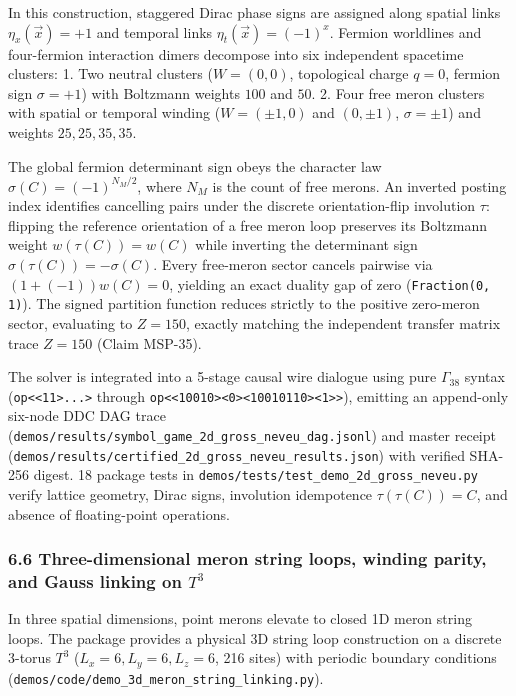 \documentclass[
  11pt,
]{article}
\newcommand{\passthrough}[1]{#1}
\begin{document}
In this construction, staggered Dirac phase signs are assigned along
spatial links \(\eta_x(\vec{x}) = +1\) and temporal links
\(\eta_t(\vec{x}) = (-1)^x\). Fermion worldlines and four-fermion
interaction dimers decompose into six independent spacetime clusters: 1.
Two neutral clusters (\(W = (0, 0)\), topological charge \(q = 0\),
fermion sign \(\sigma = +1\)) with Boltzmann weights \(100\) and \(50\).
2. Four free meron clusters with spatial or temporal winding
(\(W = (\pm 1, 0)\) and \((0, \pm 1)\), \(\sigma = \pm 1\)) and weights
\(25, 25, 35, 35\).

The global fermion determinant sign obeys the character law
\(\sigma(C) =
(-1)^{N_M / 2}\), where \(N_M\) is the count of free merons. An inverted
posting index identifies cancelling pairs under the discrete
orientation-flip involution \(\tau\): flipping the reference orientation
of a free meron loop preserves its Boltzmann weight
\(w(\tau(C)) = w(C)\) while inverting the determinant sign
\(\sigma(\tau(C)) = -\sigma(C)\). Every free-meron sector cancels
pairwise via \((1 + (-1)) w(C) = 0\), yielding an exact duality gap of
zero (\passthrough{\lstinline!Fraction(0, 1)!}). The signed partition
function reduces strictly to the positive zero-meron sector, evaluating
to \(Z = 150\), exactly matching the independent transfer matrix trace
\(Z = 150\) (Claim MSP-35).

The solver is integrated into a 5-stage causal wire dialogue using pure
\(\Gamma_{38}\) syntax (\passthrough{\lstinline!op<<11>...>!} through
\passthrough{\lstinline!op<<10010><0><10010110><1>>!}), emitting an
append-only six-node DDC DAG trace
(\nolinkurl{demos/results/symbol_game_2d_gross_neveu_dag.jsonl}) and
master receipt
(\nolinkurl{demos/results/certified_2d_gross_neveu_results.json}) with
verified SHA-256 digest. 18 package tests in
\nolinkurl{demos/tests/test_demo_2d_gross_neveu.py} verify lattice
geometry, Dirac signs, involution idempotence \(\tau(\tau(C)) = C\), and
absence of floating-point operations.

\subsubsection{\texorpdfstring{6.6 Three-dimensional meron string loops,
winding parity, and Gauss linking on
\(T^3\)}{6.6 Three-dimensional meron string loops, winding parity, and Gauss linking on T\^{}3}}\label{three-dimensional-meron-string-loops-winding-parity-and-gauss-linking-on-t3}

In three spatial dimensions, point merons elevate to closed 1D meron
string loops. The package provides a physical 3D string loop
construction on a discrete 3-torus \(T^3\)
(\(L_x = 6, L_y = 6, L_z = 6\), 216 sites) with periodic boundary
conditions (\nolinkurl{demos/code/demo_3d_meron_string_linking.py}).
\end{document}
